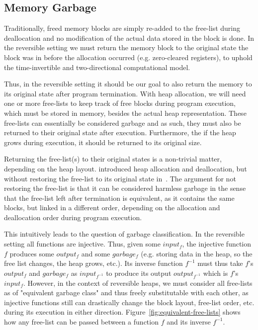 \subsection{Memory Garbage}
\label{subsec-memory-garbage}
Traditionally, freed memory blocks are simply re-added to the free-list during deallocation and no modification of the actual data stored in the block is done. In the reversible setting we must return the memory block to the original state the block was in before the allocation occurred (e.g. zero-cleared registers), to uphold the time-invertible and two-directional computational model. 

Thus, in the reversible setting it should be our goal to also return the memory to its original state after program termination. With heap allocation, we will need one or more free-lists to keep track of free blocks during program execution, which must be stored in memory, besides the actual heap representation. These free-lists can essentially be considered garbage and as such, they must also be returned to their original state after execution. Furthermore, the if the heap grows during execution, it should be returned to its original size.

Returning the free-list(s) to their original states is a non-trivial matter, depending on the heap layout. \citeauthor{ha:heap} introduced heap allocation and deallocation, but without restoring the free-list to its original state in~\cite{ha:heap}. The argument for not restoring the free-list is that it can be considered harmless garbage in the sense that the free-list left after termination is equivalent, as it contains the same blocks, but linked in a different order, depending on the allocation and deallocation order during program execution.

This intuitively leads to the question of garbage classification. In the reversible setting all functions are injective. Thus, given some $input_f$, the injective function $f$ produces some $output_f$ and some $garbage_f$ (e.g. storing data in the heap, so the free list changes, the heap grows, etc.). Its inverse function $f^{-1}$ must thus take $f$'s $output_f$ and $garbage_f$ as $input_{f^{-1}}$ to produce its output $output_{f^{-1}}$ which is $f$'s $input_f$. However, in the context of reversible heaps, we must consider all free-lists as of "equivalent garbage class" and thus freely substitutable with each other, as injective functions still can drastically change the block layout, free-list order, etc. during its execution in either direction. Figure~\ref{fig:equivalent-free-lists} shows how any free-list can be passed between a function $f$ and its inverse $f^{-1}$. 

